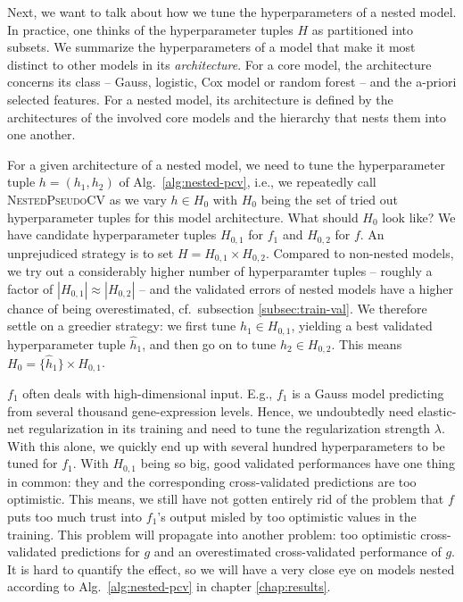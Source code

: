 Next, we want to talk about how we tune the hyperparameters of a nested model. In practice, one thinks of 
the hyperparameter tuples $H$ as partitioned into subsets. We summarize the
hyperparameters of a model that make it most distinct to other models in its \textit{architecture}. 
For a core model, the architecture concerns its class -- Gauss, logistic, Cox model or random forest 
-- and the a-priori selected features. For a nested model, its architecture is defined by the 
architectures of the involved core models and the hierarchy that nests them into one another.

For a given architecture of a nested model, we need to tune the hyperparameter tuple $h = (h_1, h_2)$ 
of 
Alg.\ \ref{alg:nested-pcv}, i.e., we repeatedly call \textsc{NestedPseudoCV} as we vary $h \in H_0$
with $H_0$ being the set of tried out hyperparameter tuples for this model architecture. What 
should $H_0$ look like? We have candidate 
hyperparameter tuples $H_{0, 1}$ for $f_1$ and $H_{0, 2}$ for $f$. An unprejudiced strategy is to 
set $H = H_{0, 1} \times H_{0, 2}$. Compared to non-nested models, we try out a considerably 
higher number of hyperparamter tuples -- roughly a factor of $|H_{0, 1}| \approx |H_{0, 2}|$ -- and 
the validated errors of nested models have a higher chance 
of being overestimated, cf.\ subsection \ref{subsec:train-val}. We therefore settle on a greedier 
strategy: we first tune $h_1 \in H_{0, 1}$, yielding a best validated hyperparameter tuple 
$\hat{h}_1$, and then go on to tune $h_2 \in H_{0, 2}$. This means $H_0 = \{ \hat{h}_1 \} 
\times H_{0, 1}$.

$f_1$ often deals with high-dimensional input. E.g., $f_1$ is a Gauss model 
predicting from 
several thousand gene-expression levels. Hence, we undoubtedly need elastic-net 
regularization in its training and need to tune the regularization strength $\lambda$. 
With this alone, we quickly end up with several hundred hyperparameters to be tuned for $f_1$. 
With $H_{0,1}$ being so big, good validated performances have one thing in common: they and the 
corresponding cross-validated predictions are too optimistic. This means, we still 
have not gotten entirely rid of the problem that $f$ puts too much trust into $f_1$'s output 
misled by too optimistic values in the training. This problem will propagate into another
problem: too optimistic cross-validated predictions for $g$ and an overestimated 
cross-validated performance of $g$. It is hard to quantify the effect, so we will have a very close 
eye on models nested according to Alg.\ \ref{alg:nested-pcv} in chapter \ref{chap:results}. 

